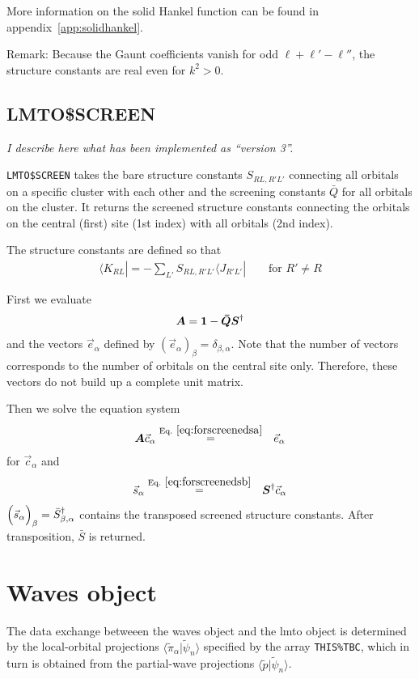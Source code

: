 \documentclass[11pt,a4paper]{report}
\begin{document}
More information on the solid Hankel function can be found in
appendix~\ref{app:solidhankel}.

Remark: Because the Gaunt coefficients vanish for odd
$\ell+\ell'-\ell''$, the structure constants are real even for
$k^2>0$.


\subsection{LMTO\$SCREEN}
\textit{I describe here what has been implemented as ``version 3''.}

\verb|LMTO$SCREEN| takes the bare structure constants $S_{RL,R'L'}$
connecting all orbitals on a specific cluster with each other and the
screening constants $\bar{Q}$ for all orbitals on the cluster. It
returns the screened structure constants connecting the orbitals on
the central (first) site (1st index) with all orbitals (2nd index).

The structure constants are defined so that
\begin{eqnarray}
\langle K_{RL}|=-\sum_{L'} S_{RL,R'L'}\langle J_{R'L'}|
\qquad\text{for $R'\neq R$}
\end{eqnarray}

First we evaluate 
\begin{eqnarray}
\bm{A}=\bm{1}-\bm{\bar{Q}}\bm{S}^\dagger
\end{eqnarray}
and the vectors $\vec{e}_\alpha$ defined by
$(\vec{e}_\alpha)_\beta=\delta_{\beta,\alpha}$. Note that the number
of vectors corresponds to the number of orbitals on the central site
only. Therefore, these vectors do not build up a complete unit matrix.

Then we solve the equation system
\begin{eqnarray}
\mat{A}\vec{c}_\alpha
&\eqrel{eq:forscreenedsa}{=}&
\vec{e}_\alpha
\end{eqnarray}
for $\vec{c}_\alpha$ and
\begin{eqnarray}
\vec{s}_\alpha&\eqrel{eq:forscreenedsb}{=}&
\mat{S}^\dagger\vec{c}_\alpha
\end{eqnarray}
$\Bigl(\vec{s}_\alpha\Bigr)_\beta=\bar{S}^\dagger_{\beta,\alpha}$
contains the transposed screened structure constants. After
transposition, $\bar{S}$ is returned.

\section{Waves object}
The data exchange betweeen the waves object and the lmto object is
determined by the local-orbital projections
$\langle\tilde{\pi}_\alpha|\tilde{\psi}_n\rangle$ specified by the
array \verb|THIS%TBC|, which in turn is obtained from the partial-wave
projections $\langle\tilde{p}|\tilde{\psi}_n\rangle$.
\end{document}
